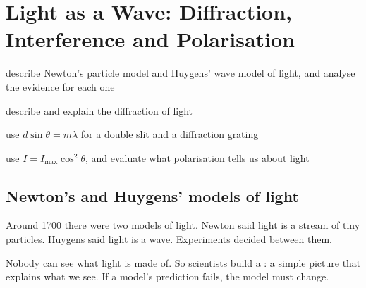\chapter{Light as a Wave: Diffraction, Interference and Polarisation}\label{ch2:chap}


\begin{goals}
  \item describe Newton's particle model and Huygens' wave model of light, and
        analyse the evidence for each one
  \item describe and explain the diffraction of light
  \item use $d\sin\theta = m\lambda$ for a double slit and a diffraction grating
  \item use $I = I_\mathrm{max}\cos^2\theta$, and evaluate what polarisation tells us
        about light
\end{goals}

\section{Newton's and Huygens' models of light}\label{ch2:sec:models}

\begin{bigidea}
Around 1700 there were two models of light. Newton said light is a stream of tiny
particles. Huygens said light is a wave. Experiments decided between them.
\end{bigidea}

\begin{keywords}
\end{keywords}

Nobody can see what light is made of. So scientists build a : a simple
picture that explains what we see. If a model's prediction fails, the model must change.

